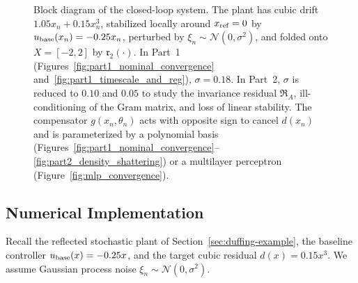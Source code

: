 \begin{figure}[htpb]
\begin{tikzpicture}
\end{tikzpicture}
\caption{Block diagram of the closed-loop system. The plant has cubic drift $1.05x_n + 0.15x_n^3$, stabilized locally around $x_{\rm ref}=0$ by $u_{\rm base}(x_n) = -0.25x_n$, perturbed by $\xi_n \sim \mathcal{N}(0,\sigma^2)$, and folded onto $X=[-2,2]$ by $\mathfrak{r}_2(\cdot)$. In Part~1 (Figures~\ref{fig:part1_nominal_convergence} and~\ref{fig:part1_timescale_and_reg}), $\sigma=0.18$. In Part~2, $\sigma$ is reduced to $0.10$ and $0.05$ to study the invariance residual $\mathfrak{R}_A$, ill-conditioning of the Gram matrix, and loss of linear stability. The compensator $g(x_n,\theta_n)$ acts with opposite sign to cancel $d(x_n)$ and is parameterized by a polynomial basis (Figures~\ref{fig:part1_nominal_convergence}--\ref{fig:part2_density_shattering}) or a multilayer perceptron (Figure~\ref{fig:mlp_convergence}).}
\label{fig:block_diagram}
\end{figure}

\subsection{Numerical Implementation}
\label{sec:numerical-implementation}

Recall the reflected stochastic plant of Section~\ref{sec:duffing-example}, the baseline controller $u_{\rm base}(x) = -0.25x$, and the target cubic residual $d(x) = 0.15x^3$. We assume Gaussian process noise $\xi_n \sim \mathcal{N}(0,\sigma^2)$.

